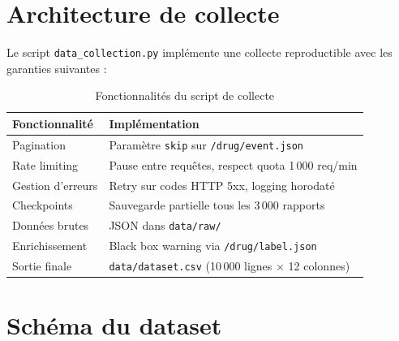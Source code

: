 \documentclass[11pt,a4paper,twoside,openright]{report}
\begin{document}
\section{Architecture de collecte}

Le script \texttt{data\_collection.py} implémente une collecte reproductible avec les garanties suivantes :

\begin{table}[H]
  \centering
  \caption{Fonctionnalités du script de collecte}
  \label{tab:collect}
  \begin{tabular}{lp{9cm}}
    \toprule
    \textbf{Fonctionnalité} & \textbf{Implémentation} \\
    \midrule
    Pagination & Paramètre \texttt{skip} sur \texttt{/drug/event.json} \\
    Rate limiting & Pause entre requêtes, respect quota 1\,000 req/min \\
    Gestion d'erreurs & Retry sur codes HTTP 5xx, logging horodaté \\
    Checkpoints & Sauvegarde partielle tous les 3\,000 rapports \\
    Données brutes & JSON dans \texttt{data/raw/} \\
    Enrichissement & Black box warning via \texttt{/drug/label.json} \\
    Sortie finale & \texttt{data/dataset.csv} (10\,000 lignes $\times$ 12 colonnes) \\
    \bottomrule
  \end{tabular}
\end{table}

\section{Schéma du dataset}
\end{document}
